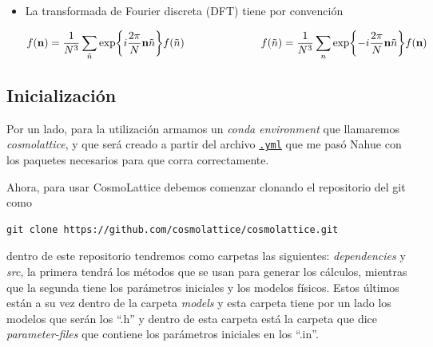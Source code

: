 \begin{itemize}
    \begin{equation}
        f(\textbf{x}) = \frac{1}{(2\pi)^3} \int f(\textbf{k}) e^{ikx} \ d^3 k \hspace{2.5cm} f(\textbf{k}) = \int f(\textbf{x}) e^{-i k x} \ d^3 x
    \end{equation}

    \item La transformada de Fourier discreta (DFT) tiene por convención

    \begin{equation}
        f(\textbf{n}) =   \frac{1}{N^3} \sum_{\tilde{n}} \exp{\displaystyle i \frac{2 \pi}{N} \textbf{n} \textbf{$\tilde{n}$}} f(\textbf{$\tilde{n}$}) \hspace{2.5cm} f(\textbf{$\tilde{n}$}) =   \frac{1}{N^3} \sum_{n} \exp{- \displaystyle i \frac{2 \pi}{N} \textbf{n} \textbf{$\tilde{n}$}} f(\textbf{n})   
    \end{equation}
\end{itemize}

\subsection{Inicialización}

Por un lado, para la utilización armamos un \textit{conda environment} que llamaremos \textit{cosmolattice}, y que será creado a partir del archivo \textcolor{blue}{\href{https://drive.google.com/uc?export=download&id=1OmMo4wB7_Z4u8-0nX-I4SRWY4rsiE0yj}{\texttt{.yml}}} que me pasó Nahue con los paquetes necesarios para que corra correctamente.

Ahora, para usar CosmoLattice debemos comenzar clonando el repositorio del git como

\begin{lstlisting}[style = bashStyle]
git clone https://github.com/cosmolattice/cosmolattice.git
\end{lstlisting}

\noindent
dentro de este repositorio tendremos como carpetas las siguientes: \textit{dependencies} y \textit{src}, la primera tendrá los métodos que se usan para generar los cálculos, mientras que la segunda tiene los parámetros iniciales y los modelos físicos. Estos últimos están a su vez dentro de la carpeta \textit{models} y esta carpeta tiene por un lado los modelos que serán los ``.h'' y dentro de esta carpeta está la carpeta que dice \textit{parameter-files} que contiene los parámetros iniciales en los ``.in''.

